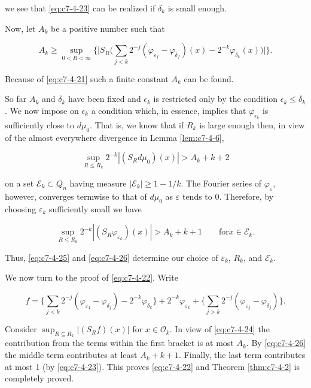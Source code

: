 we see that \eqref{eq:c7-4-23} can be realized if $\delta_{k}$ is small enough.

Now, let $A_{k}$ be a positive number such that

\begin{equation}\label{eq:c7-4-24}
A_{k}\geq\sup_{0<R<\infty}\Big\{\Big|S_{R}\Big(\sum_{j<k}2^{-j}(\varphi_{\varepsilon_{f}}-\varphi_{\delta_{f}})(x)-2^{-k}\varphi_{\delta_{k}}(x)\Big)\Big|\Big\}.
\end{equation}

Because of \eqref{eq:c7-4-21} such a finite constant $A_{k}$ can be found.

So far $A_k$ and $\delta_k$ have been fixed and $\epsilon_k$ is restricted only by the condition $\epsilon_k \leq \delta_k$. We now impose on $\epsilon_k$ a condition which, in essence, implies that $\varphi_{\epsilon_k}$ is sufficiently close to $d\mu_0$. That is, we know that if $R_k$ is large enough then, in view of the almost everywhere divergence in Lemma \ref{lem:c7-4-6},

\begin{equation}\label{eq:c7-4-25}
\sup_{R\leq R_{k}}2^{-k}|(S_{R} d\mu_{0})(x)|>A_{k}+k+2
\end{equation}

on a set $\mathcal{E}_k \subset Q_n$ having measure $|\mathcal{E}_k| \geq 1 - 1/k$. The Fourier series of $\varphi_\varepsilon$, however, converges termwise to that of $d\mu_0$ as $\varepsilon$ tends to 0. Therefore, by choosing $\varepsilon_k$ sufficiently small we have

\begin{equation}\label{eq:c7-4-26}
\sup_{R\leq R_{k}}2^{-k}|(S_{R}\varphi_{\varepsilon_{k}})(x)|>A_{k}+k+1\qquad\text{for}x\in\mathcal{E}_{k}.
\end{equation}

Thus, \eqref{eq:c7-4-25} and \eqref{eq:c7-4-26} determine our choice of $\varepsilon_{k}$, $R_{k}$, and $\mathcal{E}_{k}$.

We now turn to the proof of \eqref{eq:c7-4-22}. Write

\[
f=\Big\{\sum_{j<k}2^{-j}(\varphi_{\varepsilon_{1}}-\varphi_{\delta_{j}})-2^{-k}\varphi_{\delta_{k}}\Big\}+2^{-k}\varphi_{\varepsilon_{k}}+\Big\{\sum_{j>k}2^{-j}(\varphi_{\varepsilon_{j}}-\varphi_{\delta_{j}})\Big\}.
\]

Consider $\sup_{R \subseteq R_k} |(S_R f)(x)|$ for $x \in \mathcal{O}_k$. In view of \eqref{eq:c7-4-24} the contribution from the terms within the first bracket is at most $A_k$. By \eqref{eq:c7-4-26} the middle term contributes at least $A_k + k + 1$. Finally, the last term contributes at most 1 (by \eqref{eq:c7-4-23}). This proves \eqref{eq:c7-4-22} and Theorem \ref{thm:c7-4-2} is completely proved.

